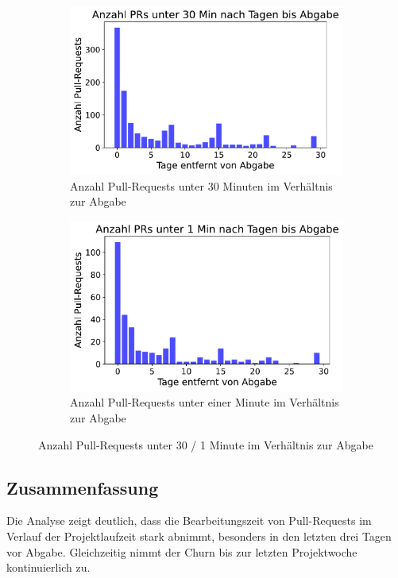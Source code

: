 \begin{figure}[htbp]
    \centering
    \begin{subfigure}[b]{0.48\textwidth}
        \centering
        \includegraphics[width=\textwidth]{Figures/anz-prs-under-30-min.pdf}
    \caption{Anzahl Pull-Requests unter 30 Minuten im Verhältnis zur Abgabe}
    \label{fig:anz-prs-under-30-min}
    \end{subfigure}
    \hfill
    \begin{subfigure}[b]{0.48\textwidth}
        \centering
        \includegraphics[width=\textwidth]{Figures/anz-prs-under-1-min.pdf}
    \caption{Anzahl Pull-Requests unter einer Minute im Verhältnis zur Abgabe}
    \label{fig:anz-prs-under-1-min}
    \end{subfigure}
    \caption{Anzahl Pull-Requests unter 30 / 1 Minute im Verhältnis zur Abgabe}
    \label{fig:anz-prs-under-x-mins}
\end{figure}

\subsection{Zusammenfassung}
Die Analyse zeigt deutlich, dass die Bearbeitungszeit von Pull-Requests im Verlauf der Projektlaufzeit stark abnimmt, besonders in den letzten drei Tagen vor Abgabe. Gleichzeitig nimmt der Churn bis zur letzten Projektwoche kontinuierlich zu.

